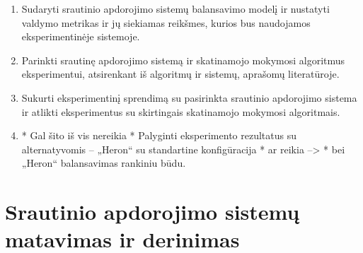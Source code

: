 \documentclass{VUMIFPSbakalaurinis}
\begin{document}
\begin{enumerate}
    \item Sudaryti srautinio apdorojimo sistemų balansavimo modelį ir nustatyti valdymo metrikas ir jų siekiamas reikšmes, kurios bus naudojamos eksperimentinėje sistemoje.
    \item Parinkti srautinę apdorojimo sistemą ir skatinamojo mokymosi algoritmus eksperimentui, atsirenkant iš algoritmų ir sistemų, aprašomų literatūroje.
    \item Sukurti eksperimentinį sprendimą su pasirinkta srautinio apdorojimo sistema ir atlikti eksperimentus su skirtingais skatinamojo mokymosi algoritmais.
    \item * Gal šito iš vis nereikia *  Palyginti eksperimento rezultatus su alternatyvomis – „Heron“ su standartine konfigūracija  * ar reikia –> * bei „Heron“ balansavimas rankiniu būdu. 
\end{enumerate}



\section{Srautinio apdorojimo sistemų matavimas ir derinimas}
\end{document}
